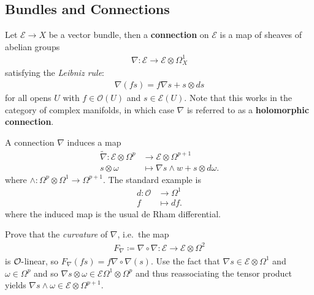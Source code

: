 \hypertarget{bundles-and-connections}{%
\subsection{Bundles and Connections}\label{bundles-and-connections}}

\begin{definition}[Connections]

Let \(\mathcal{E}\to X\) be a vector bundle, then a \textbf{connection}
on \(\mathcal{E}\) is a map of sheaves of abelian groups
\begin{align*}
\nabla: \mathcal{E}\to \mathcal{E}\otimes\Omega^1_X  
\end{align*}
satisfying the \emph{Leibniz rule}:
\begin{align*} 
\nabla (fs) = f \nabla s + s\otimes ds 
\end{align*}
for all opens \(U\) with \(f\in {\mathcal{O}}(U)\) and
\(s\in \mathcal{E}(U)\). Note that this works in the category of complex
manifolds, in which case \(\nabla\) is referred to as a
\textbf{holomorphic connection}.

\end{definition}

\begin{remark}

A connection \(\nabla\) induces a map
\begin{align*}
\tilde{\nabla}: \mathcal{E}\otimes\Omega^p &\to \mathcal{E}\otimes\Omega^{p+1} \\
s \otimes \omega &\mapsto \nabla s \wedge w + s\otimes d \omega
.\end{align*}
where \(\wedge: \Omega^p \otimes\Omega^1 \to \Omega^{p+1}\). The
standard example is
\begin{align*}
d: {\mathcal{O}}&\to \Omega^1 \\
f &\mapsto df
.\end{align*}
where the induced map is the usual de Rham differential.

\end{remark}

\begin{exercise}[?]

Prove that the \emph{curvature} of \(\nabla\), i.e.~the map
\begin{align*}
F_{\nabla} \coloneqq\nabla \circ \nabla: \mathcal{E}\to \mathcal{E}\otimes\Omega^2  
\end{align*}
is \({\mathcal{O}}{\hbox{-}}\)linear, so
\(F_{\nabla}(fs) = f\nabla \circ \nabla(s)\). Use the fact that
\(\nabla s \in \mathcal{E}\otimes\Omega^1\) and \(\omega \in \Omega^p\)
and so
\(\nabla s \otimes \omega \in \mathcal{E} \Omega^1 \otimes \Omega^p\)
and thus reassociating the tensor product yields
\(\nabla s \wedge \omega \in \mathcal{E}\otimes\Omega^{p+1}\).

\end{exercise}

